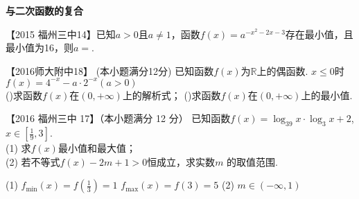   \begin{exercise}{\bf 与二次函数的复合}
    \item
      【2015 福州三中14】已知$a>0$且$a\neq1$，函数$f(x)=a^{-x^2-2x-3}$存在最小值，且最小值为16，则$a=$\tk.\\
    \item
      【2016师大附中18】 (本小题满分12分)
      已知函数$f(x)$为$\mathbb{R}$上的偶函数. $x\leq0$时$f(x)=4^{-x}-a\cdot 2^{-x}(a>0)$\\
      ()求函数$f(x)$在$(0,+\infty)$上的解析式；
      ()求函数$f(x)$在$(0,+\infty)$上的最小值.
    \vspace{12em}
    \item
      【2016 福州三中 17】（本小题满分 12 分）
      已知函数$f(x)=\log_39x\cdot\log_3x+2 $,$x\in[\frac19,3]$.\\
      (1) 求$f(x)$最小值和最大值；\\
      (2) 若不等式$f(x)-2m+1>0 $恒成立，求实数$m$ 的取值范围.
      \begin{answer}
        (1) $f_{\min}(x)=f(\frac13)=1$
              $f_{\max}(x)=f(3)=5$
        (2) $m\in(-\infty,1)$
      \end{answer}
    \vspace{14em}
  \end{exercise}

